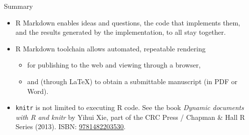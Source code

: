 \documentclass[ignorenonframetext,]{beamer}
\providecommand{\tightlist}{%
  \setlength{\itemsep}{0pt}\setlength{\parskip}{0pt}}
\begin{document}
\begin{frame}[fragile]{%
\protect\hypertarget{summary}{%
Summary}}

\begin{itemize}
\item
  R Markdown enables ideas and questions, the code that implements them,
  and the results generated by the implementation, to all stay together.
\item
  R Markdown toolchain allows automated, repeatable rendering

  \begin{itemize}
  \tightlist
  \item
    for publishing to the web and viewing through a browser,
  \item
    and (through LaTeX) to obtain a submittable manuscript (in PDF or
    Word).
  \end{itemize}
\item
  \texttt{knitr} is not limited to executing R code. See the book
  \emph{Dynamic documents with R and knitr} by Yihui Xie, part of the
  CRC Press / Chapman \& Hall R Series (2013). ISBN:
  \href{http://www.isbnsearch.org/isbn/9781482203530}{9781482203530}.
\end{itemize}

\end{frame}
\end{document}

